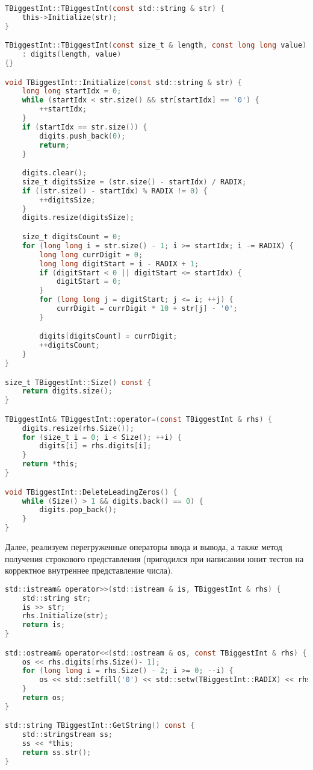 \begin{lstlisting}[language=C]
TBiggestInt::TBiggestInt(const std::string & str) {
    this->Initialize(str);
}

TBiggestInt::TBiggestInt(const size_t & length, const long long value) 
    : digits(length, value)
{}

void TBiggestInt::Initialize(const std::string & str) {
    long long startIdx = 0;
    while (startIdx < str.size() && str[startIdx] == '0') {
        ++startIdx;
    }
    if (startIdx == str.size()) {
        digits.push_back(0);
        return;
    }

    digits.clear();
    size_t digitsSize = (str.size() - startIdx) / RADIX;
    if ((str.size() - startIdx) % RADIX != 0) {
        ++digitsSize;
    }
    digits.resize(digitsSize);

    size_t digitsCount = 0;
    for (long long i = str.size() - 1; i >= startIdx; i -= RADIX) {
        long long currDigit = 0;
        long long digitStart = i - RADIX + 1;
        if (digitStart < 0 || digitStart <= startIdx) {
            digitStart = 0;
        }
        for (long long j = digitStart; j <= i; ++j) {
            currDigit = currDigit * 10 + str[j] - '0';
        }

        digits[digitsCount] = currDigit;
        ++digitsCount;
    }
}

size_t TBiggestInt::Size() const {
    return digits.size();
}

TBiggestInt& TBiggestInt::operator=(const TBiggestInt & rhs) {
    digits.resize(rhs.Size());
    for (size_t i = 0; i < Size(); ++i) {
        digits[i] = rhs.digits[i];
    }
    return *this;
}

void TBiggestInt::DeleteLeadingZeros() {
    while (Size() > 1 && digits.back() == 0) {
        digits.pop_back();
    }
}
\end{lstlisting}


Далее, реализуем перегруженные операторы ввода и вывода, а также метод получения строкового представления (пригодился при написании юнит тестов на корректное внутреннее представление числа).

\begin{lstlisting}[language=C]
std::istream& operator>>(std::istream & is, TBiggestInt & rhs) {
    std::string str;
    is >> str;
    rhs.Initialize(str);
    return is;
}

std::ostream& operator<<(std::ostream & os, const TBiggestInt & rhs) {
    os << rhs.digits[rhs.Size()- 1];
    for (long long i = rhs.Size() - 2; i >= 0; --i) {
        os << std::setfill('0') << std::setw(TBiggestInt::RADIX) << rhs.digits[i]; 
    }
    return os;
}

std::string TBiggestInt::GetString() const {
    std::stringstream ss;
    ss << *this;
    return ss.str();
}
\end{lstlisting}

